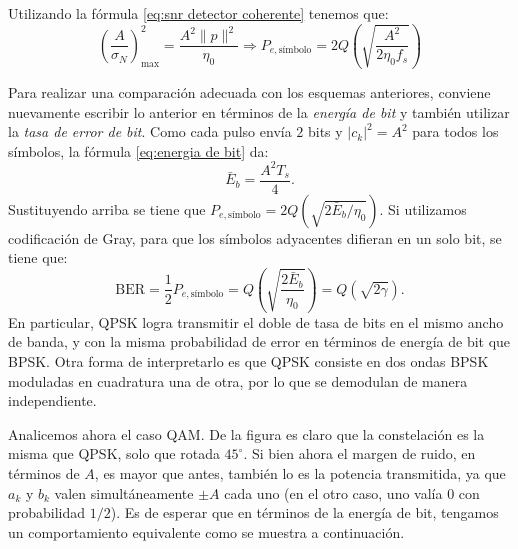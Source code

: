 \begin{ejemplo}
Utilizando la fórmula \eqref{eq:snr detector coherente} tenemos que:
\begin{equation*}
    \left(\frac{A}{\sigma_N}\right)_{\max}^2 = \frac{A^2\|p\|^2}{\eta_0} \Rightarrow P_{e,\text{símbolo}} = 2Q\left(\sqrt{\frac{A^2}{2\eta_0 f_s}}\right)
\end{equation*}

Para realizar una comparación adecuada con los esquemas anteriores, conviene nuevamente escribir lo anterior en términos de la \emph{energía de bit} y también utilizar la \emph{tasa de error de bit}. Como cada pulso envía $2$ bits y $|c_k|^2=A^2$ para todos los símbolos, la fórmula \eqref{eq:energia de bit} da:
\begin{equation*}
    \bar{E}_b = \frac{A^2 T_s}{4}.
\end{equation*}
Sustituyendo arriba se tiene que $P_{e,\text{símbolo}} = 2Q\left(\sqrt{2\bar{E}_b/\eta_0}\right)$. Si utilizamos codificación de Gray, para que los símbolos adyacentes difieran en un solo bit, se tiene que:
\begin{equation*}
    \mathrm{BER} = \frac{1}{2}P_{e,\text{símbolo}} = Q\left(\sqrt{\frac{2\bar{E}_b}{\eta_0}}\right) = Q\left(\sqrt{2\gamma}\right).
\end{equation*}
En particular, QPSK logra transmitir el doble de tasa de bits en el mismo ancho de banda, y con la misma probabilidad de error en términos de energía de bit que BPSK. Otra forma de interpretarlo es que QPSK consiste en dos ondas BPSK moduladas en cuadratura una de otra, por lo que se demodulan de manera independiente.

Analicemos ahora el caso QAM. De la figura es claro que la constelación es la misma que QPSK, solo que rotada $45^\circ$. Si bien ahora el margen de ruido, en términos de $A$, es mayor que antes, también lo es la potencia transmitida, ya que $a_k$ y $b_k$ valen simultáneamente $\pm A$ cada uno (en el otro caso, uno valía $0$ con probabilidad $1/2$). Es de esperar que en términos de la energía de bit, tengamos un comportamiento equivalente como se muestra a continuación.


\end{ejemplo}
